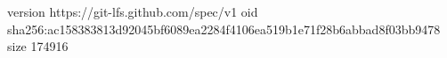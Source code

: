 version https://git-lfs.github.com/spec/v1
oid sha256:ac158383813d92045bf6089ea2284f4106ea519b1e71f28b6abbad8f03bb9478
size 174916
